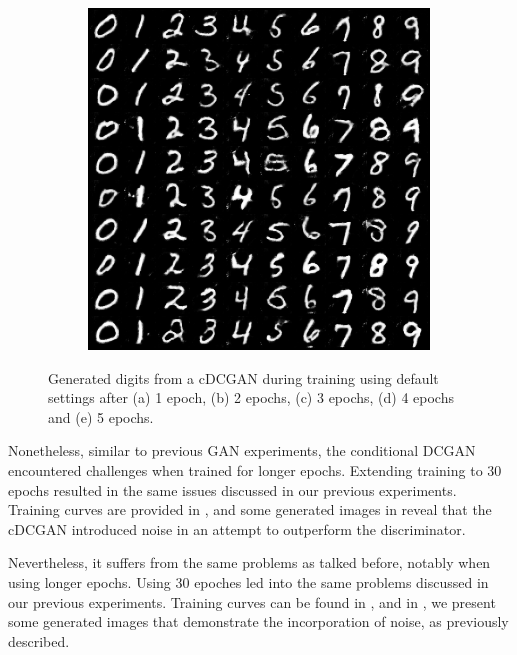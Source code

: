 \begin{figure}[H]
\begin{subfigure}{0.2\textwidth}
        \caption{}
        \label{subfig:cDCGAN/fake_sample_epoch_0004}
    \end{subfigure}%
    \begin{subfigure}{0.2\textwidth}
        \centering
        \includegraphics[width=0.95\linewidth]{cDCGAN/fake_sample_epoch_0005.png}
        \caption{}
        \label{subfig:cDCGAN/fake_sample_epoch_0005}
    \end{subfigure}

    \caption{Generated digits from a cDCGAN during training using default settings after (a) 1 epoch, (b) 2 epochs, (c) 3 epochs, (d) 4 epochs and (e) 5 epochs.}
    \label{fig:cDCGAN_default}
\end{figure}

Nonetheless, similar to previous GAN experiments, the conditional DCGAN encountered challenges when trained for longer epochs. Extending training to 30 epochs resulted in the same issues discussed in our previous experiments. Training curves are provided in , and some generated images in  reveal that the cDCGAN introduced noise in an attempt to outperform the discriminator.

Nevertheless, it suffers from the same problems as talked before, notably when using longer epochs. Using 30 epoches led into the same problems discussed in our previous experiments. Training curves can be found in , and in , we present some generated images that demonstrate the incorporation of noise, as previously described.

